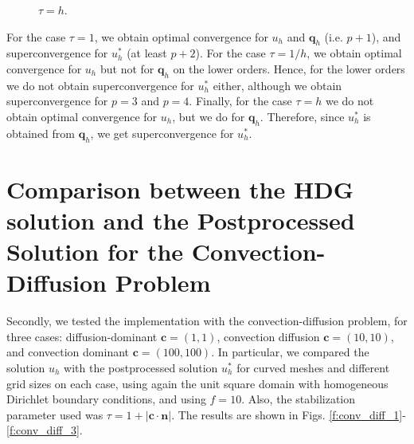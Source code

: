 \documentclass[10pt,a4paper]{article}
\begin{document}
\begin{figure}[H]
    \centering
    \caption{$\tau = h$.}
    \label{f:conv_tau_h}
\end{figure}
For the case $\tau = 1$, we obtain optimal convergence for $u_h$ and $\mathbf{q}_h$ (i.e. $p+1$), and superconvergence for $u^*_h$ (at least $p+2$).
For the case $\tau = 1/h$, we obtain optimal convergence for $u_h$ but not for $\mathbf{q}_h$ on the lower orders. Hence, for the lower orders we do not obtain superconvergence for $u^*_h$ either,
although we obtain superconvergence for $p = 3$ and $p=4$. Finally, for the case $\tau = h$ we do not obtain optimal convergence for $u_h$, but we do for $\mathbf{q}_h$. Therefore, since $u^*_h$ is obtained from $\mathbf{q}_h$, we get superconvergence for $u^*_h$.

\section*{Comparison between the HDG solution and the Postprocessed Solution
for the Convection-Diffusion Problem}

Secondly, we tested the implementation with the convection-diffusion problem, for three cases:
diffusion-dominant $\mathbf{c} = (1,1)$, convection diffusion $\mathbf{c} = (10,10)$, and convection dominant $\mathbf{c} = (100,100)$. In particular, we compared the solution
$u_h$ with the postprocessed solution $u^*_h$ for curved meshes and different grid sizes on each case, using again the unit square domain with homogeneous Dirichlet boundary conditions, and using $f=10$. Also, the 
stabilization parameter used was $\tau = 1 + |\mathbf{c} \cdot \mathbf{n}|$.
The results are shown in Figs. \ref{f:conv_diff_1}-\ref{f:conv_diff_3}.
\end{document}
